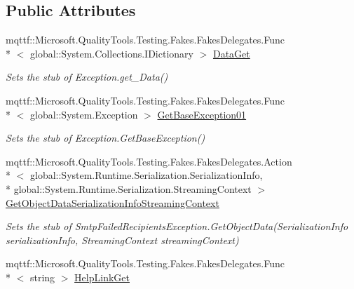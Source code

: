 \subsection*{Public Attributes}
\begin{DoxyCompactItemize}
\item 
mqttf\-::\-Microsoft.\-Quality\-Tools.\-Testing.\-Fakes.\-Fakes\-Delegates.\-Func\\*
$<$ global\-::\-System.\-Collections.\-I\-Dictionary $>$ \hyperlink{class_system_1_1_net_1_1_mail_1_1_fakes_1_1_stub_smtp_failed_recipients_exception_ab355b951001bca187815bf751afbd6ea}{Data\-Get}
\begin{DoxyCompactList}\small\item\em Sets the stub of Exception.\-get\-\_\-\-Data()\end{DoxyCompactList}\item 
mqttf\-::\-Microsoft.\-Quality\-Tools.\-Testing.\-Fakes.\-Fakes\-Delegates.\-Func\\*
$<$ global\-::\-System.\-Exception $>$ \hyperlink{class_system_1_1_net_1_1_mail_1_1_fakes_1_1_stub_smtp_failed_recipients_exception_ae3904eaabbcb766ab189c6bf1510458c}{Get\-Base\-Exception01}
\begin{DoxyCompactList}\small\item\em Sets the stub of Exception.\-Get\-Base\-Exception()\end{DoxyCompactList}\item 
mqttf\-::\-Microsoft.\-Quality\-Tools.\-Testing.\-Fakes.\-Fakes\-Delegates.\-Action\\*
$<$ global\-::\-System.\-Runtime.\-Serialization.\-Serialization\-Info, \\*
global\-::\-System.\-Runtime.\-Serialization.\-Streaming\-Context $>$ \hyperlink{class_system_1_1_net_1_1_mail_1_1_fakes_1_1_stub_smtp_failed_recipients_exception_a70494e3b2c20af95487fb09e4c5ed0cd}{Get\-Object\-Data\-Serialization\-Info\-Streaming\-Context}
\begin{DoxyCompactList}\small\item\em Sets the stub of Smtp\-Failed\-Recipients\-Exception.\-Get\-Object\-Data(\-Serialization\-Info serialization\-Info, Streaming\-Context streaming\-Context)\end{DoxyCompactList}\item 
mqttf\-::\-Microsoft.\-Quality\-Tools.\-Testing.\-Fakes.\-Fakes\-Delegates.\-Func\\*
$<$ string $>$ \hyperlink{class_system_1_1_net_1_1_mail_1_1_fakes_1_1_stub_smtp_failed_recipients_exception_a9ecb60c4403a05e68da692ad08323ff1}{Help\-Link\-Get}

\end{DoxyCompactItemize}
